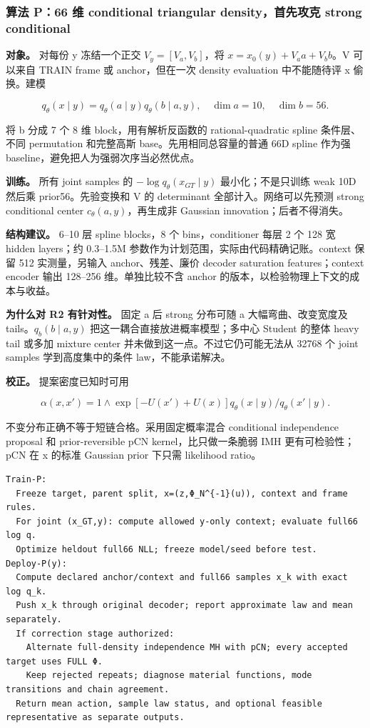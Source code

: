 \documentclass[
  11pt,
  a4paper,
]{article}
\begin{document}
\hypertarget{ux7b97ux6cd5-p66-ux7ef4-conditional-triangular-densityux9996ux5148ux653bux514b-strong-conditional}{%
\subsubsection{算法 P：66 维 conditional triangular density，首先攻克
strong
conditional}\label{ux7b97ux6cd5-p66-ux7ef4-conditional-triangular-densityux9996ux5148ux653bux514b-strong-conditional}}

\textbf{对象。} 对每份 y 冻结一个正交 \(V_y=[V_a,V_b]\)，将
\(x=x_0(y)+V_a a+V_b b\)。V 可以来自 TRAIN frame 或 anchor，但在一次
density evaluation 中不能随待评 x 偷换。建模

\[
q_\theta(x\mid y)=q_\theta(a\mid y)q_\theta(b\mid a,y),\quad \dim a=10,\quad\dim b=56.
\]

将 b 分成 7 个 8 维 block，用有解析反函数的 rational-quadratic spline
条件层、不同 permutation 和完整高斯 base。先用相同总容量的普通 66D
spline 作为强 baseline，避免把人为强弱次序当必然优点。

\textbf{训练。} 所有 joint samples 的 \(-\log q_\theta(x_{GT}\mid y)\)
最小化；不是只训练 weak 10D 然后乘 prior56。先验变换和 V 的 determinant
全部计入。网络可以先预测 strong conditional center
\(c_\theta(a,y)\)，再生成非 Gaussian innovation；后者不得消失。

\textbf{结构建议。} 6--10 层 spline blocks，8 个 bins，conditioner 每层
2 个 128 宽 hidden layers；约 0.3--1.5M
参数作为计划范围，实际由代码精确记账。context 保留 512 实测量，另输入
anchor、残差、廉价 decoder saturation features；context encoder 输出
128--256 维。单独比较不含 anchor 的版本，以检验物理上下文的成本与收益。

\textbf{为什么对 R2 有针对性。} 固定 a 后 strong 分布可随 a
大幅弯曲、改变宽度及 tails。\(q_b(b\mid a,y)\)
把这一耦合直接放进概率模型；多中心 Student 的整体 heavy tail 或多加
mixture center 并未做到这一点。不过它仍可能无法从 32768 个 joint samples
学到高度集中的条件 law，不能承诺解决。

\textbf{校正。} 提案密度已知时可用

\[
\alpha(x,x')=1\wedge \exp[-U(x')+U(x)]q_\theta(x\mid y)/q_\theta(x'\mid y).
\]

不变分布正确不等于短链合格。采用固定概率混合 conditional independence
proposal 和 prior-reversible pCN kernel，比只做一条脆弱 IMH
更有可检验性；pCN 在 x 的标准 Gaussian prior 下只需 likelihood ratio。

\begin{verbatim}
Train-P:
  Freeze target, parent split, x=(z,Φ_N^{-1}(u)), context and frame rules.
  For joint (x_GT,y): compute allowed y-only context; evaluate full66 log q.
  Optimize heldout full66 NLL; freeze model/seed before test.
Deploy-P(y):
  Compute declared anchor/context and full66 samples x_k with exact log q_k.
  Push x_k through original decoder; report approximate law and mean separately.
  If correction stage authorized:
    Alternate full-density independence MH with pCN; every accepted target uses FULL Φ.
    Keep rejected repeats; diagnose material functions, mode transitions and chain agreement.
  Return mean action, sample law status, and optional feasible representative as separate outputs.
\end{verbatim}
\end{document}

